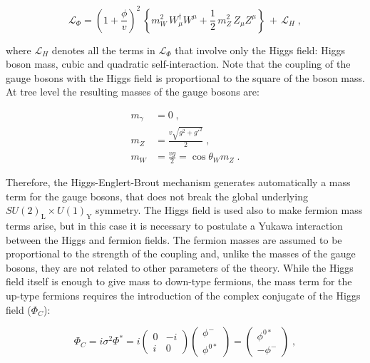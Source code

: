 \begin{equation}
\mathcal{L}_{\Phi} = \left(1+\frac{\phi}{v}\right)^2 \,
\left\{ m_W^2\, W_\mu^\dagger W^\mu
+ \frac{1}{2}\, m_Z^2\, Z_\mu Z^\mu \right\}\, +\, \mathcal{L}_H \; , 
\end{equation}

\noindent where $\mathcal{L}_H$ denotes all the terms in $\mathcal{L}_{\Phi}$ that involve only the Higgs field: Higgs boson mass, cubic and quadratic self-interaction. Note that the coupling of the gauge bosons with the Higgs field is proportional to the square of the boson mass.
At tree level the resulting masses of the gauge bosons are:

\begin{equation}
\begin{aligned}
m_\gamma &= 0 \; ,\\
m_Z &= \frac{v \sqrt{g^2 + g'^2}}{2} \; , \\
m_W &= \frac{vg}{2} =  \cos\theta_W m_Z \; .
\end{aligned}
\end{equation}


Therefore, the Higgs-Englert-Brout mechanism generates automatically a mass term for the gauge bosons, that does not break the global underlying $SU(2)_\mathrm{L} \times U(1)_\mathrm{Y}$ symmetry. The Higgs field is used also to make fermion mass terms arise, but in this case it is necessary to postulate a Yukawa interaction between the Higgs and fermion fields. The fermion masses are assumed to be proportional to the strength of the coupling and, unlike the masses of the gauge bosons, they are not related to other parameters of the theory. While the Higgs field itself is enough to give mass to down-type fermions, the mass term for the up-type fermions  requires the introduction of the complex conjugate of the Higgs field ($\Phi_C$):

\begin{equation}
 \Phi_C = i \sigma^2 \Phi^* 
	= i \left( \begin{array}{cc} 0 & -i \\ i & 0 \end{array} \right) 
	\left( \begin{array}{c} \phi^- \\ \phi^{0*} \end{array} \right)
	= \left( \begin{array}{c} \phi^{0*} \\ - \phi^- \end{array} \right) \; ,
\end{equation}

